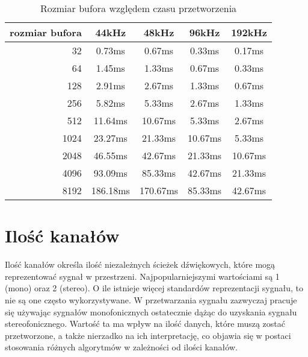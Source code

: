 \begin{table}[t]
    \begin{center}
        \caption{Rozmiar bufora względem czasu przetworzenia}
        \label{tab:wielkość bufora}
        \begin{tabular}{r|c|c|c|c}
            rozmiar bufora  &   44kHz  &   48kHz  &  96kHz  &  192kHz \\
            \hline
            32              &   0.73ms &   0.67ms &  0.33ms &  0.17ms \\
            64              &   1.45ms &   1.33ms &  0.67ms &  0.33ms \\
            128             &   2.91ms &   2.67ms &  1.33ms &  0.67ms \\
            256             &   5.82ms &   5.33ms &  2.67ms &  1.33ms \\
            512             &  11.64ms &  10.67ms &  5.33ms &  2.67ms \\
            1024            &  23.27ms &  21.33ms & 10.67ms &  5.33ms \\
            2048            &  46.55ms &  42.67ms & 21.33ms & 10.67ms \\
            4096            &  93.09ms &  85.33ms & 42.67ms & 21.33ms \\
            8192            & 186.18ms & 170.67ms & 85.33ms & 42.67ms \\
        \end{tabular}
    \end{center}
\end{table}



\section{Ilość kanałów}
Ilość kanałów określa ilość niezależnych ścieżek dźwiękowych, które mogą reprezentować sygnał w przestrzeni. Najpopularniejszymi wartościami są 1 (mono) oraz 2 (stereo). O ile istnieje więcej standardów reprezentacji sygnału, to nie są one często wykorzystywane. W przetwarzania sygnału zazwyczaj pracuje się używając sygnałów monofonicznych ostatecznie dążąc do uzyskania sygnału stereofonicznego. Wartość ta ma wpływ na ilość danych, które muszą zostać przetworzone, a także nierzadko na ich interpretację, co objawia się w postaci stosowania różnych algorytmów w zależności od ilości kanałów.

